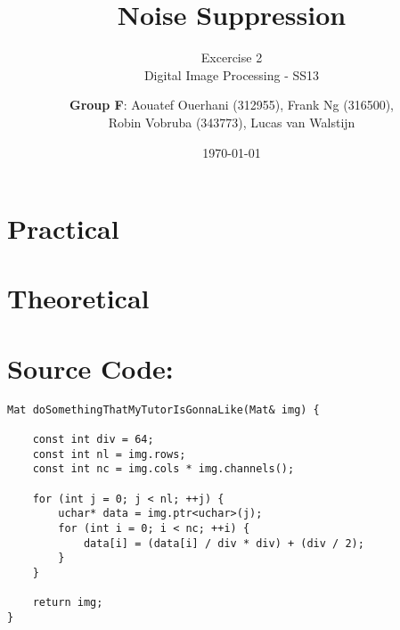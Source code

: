 \documentclass[a4paper,headings=small]{scrartcl}
\title{Noise Suppression}
\subtitle{Excercise 2 \\ Digital Image Processing - SS13}
\author{\textbf{Group F}: Aouatef Ouerhani (312955), Frank Ng (316500),\\ Robin Vobruba (343773), Lucas van Walstijn}
\date{\today}
\numberwithin{equation}{section} %
\numberwithin{figure}{section}   %
\begin{document}
\maketitle

\section{Practical}

\section{Theoretical}


\newpage
\section{Source Code:}

\begin{lstlisting}[label=interstingFunction,caption=The function with the color-reduction code.]
Mat doSomethingThatMyTutorIsGonnaLike(Mat& img) {

	const int div = 64;
	const int nl = img.rows;
	const int nc = img.cols * img.channels();

	for (int j = 0; j < nl; ++j) {
		uchar* data = img.ptr<uchar>(j);
		for (int i = 0; i < nc; ++i) {
			data[i] = (data[i] / div * div) + (div / 2);
		}
	}

	return img;
}
\end{lstlisting}

\end{document}

